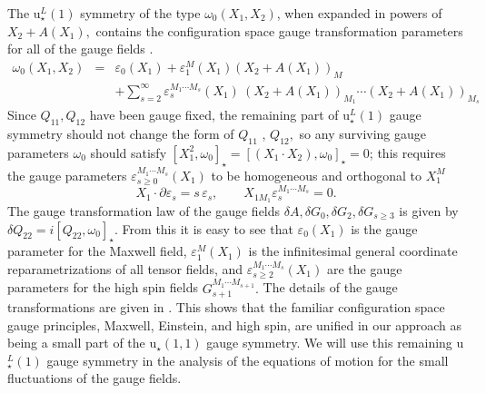 \documentclass[a4paper,12pt]{article}
\begin{document}
The u$_{\star }^{L}\left( 1\right) $ symmetry of the type $\omega _{0}\left(
X_{1},X_{2}\right) $, when expanded in powers of $X_{2}+A\left( X_{1}\right)
,$ contains the configuration space gauge transformation parameters for all
of the gauge fields \cite{highspin}. 
\begin{eqnarray}
\omega _{0}\left( X_{1},X_{2}\right) &=&\varepsilon _{0}\left( X_{1}\right)
+\varepsilon _{1}^{M}\left( X_{1}\right) \left( X_{2}+A\left( X_{1}\right)
\right) _{M}  \label{remain1} \\
&&+\sum_{s=2}^{\infty }\varepsilon _{s}^{M_{1}\cdots M_{s}}\left(
X_{1}\right) \ \left( X_{2}+A\left( X_{1}\right) \right) _{M_{1}}\cdots
\left( X_{2}+A\left( X_{1}\right) \right) _{M_{s}}  \nonumber
\end{eqnarray}
Since $Q_{11},Q_{12}$ have been gauge fixed, the remaining part of u$_{\star
}^{L}\left( 1\right) $ gauge symmetry should not change the form of $Q_{11}$%
, $Q_{12},$ so any surviving gauge parameters $\omega _{0}$ should satisfy $%
\left[ X_{1}^{2},\omega _{0}\right] _{\star }=\left[ \left( X_{1}\cdot
X_{2}\right) ,\omega _{0}\right] _{\star }=0$; this requires the gauge
parameters $\varepsilon _{s\geq 0}^{M_{1}\cdots M_{s}}\left( X_{1}\right) $
to be homogeneous and orthogonal to $X_{1}^{M}$ 
\begin{equation}
X_{1}\cdot \partial \varepsilon _{s}=s\,\varepsilon _{s},\qquad
X_{1M_{1}}\varepsilon _{s}^{M_{1}\cdots M_{s}}=0.  \label{remain2}
\end{equation}
The gauge transformation law of the gauge fields $\delta A,\delta
G_{0},\delta G_{2},\delta G_{s\geq 3}$ is given by $\delta Q_{22}=i\left[
Q_{22},\omega _{0}\right] _{\star }.$ From this it is easy to see that $%
\varepsilon _{0}\left( X_{1}\right) $ is the gauge parameter for the Maxwell
field, $\varepsilon _{1}^{M}\left( X_{1}\right) $ is the infinitesimal
general coordinate reparametrizations of all tensor fields, and $\varepsilon
_{s\geq 2}^{M_{1}\cdots M_{s}}\left( X_{1}\right) $ are the gauge parameters
for the high spin fields $G_{s+1}^{M_{1}\cdots M_{s+1}}.$ The details of the
gauge transformations are given in \cite{highspin}. This shows that the
familiar configuration space gauge principles, Maxwell, Einstein, and high
spin, are unified in our approach as being a small part of the u$_{\star
}\left( 1,1\right) $ gauge symmetry. We will use this remaining u$_{\star
}^{L}\left( 1\right) $ gauge symmetry in the analysis of the equations of
motion for the small fluctuations of the gauge fields.
\end{document}
